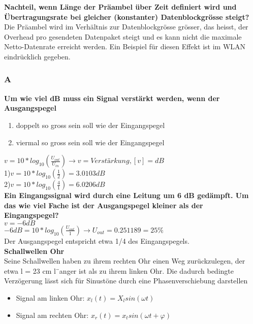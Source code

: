 \textbf{Nachteil, wenn Länge der Präambel über Zeit definiert wird und Übertragungsrate bei gleicher (konstanter) Datenblockgrösse steigt?}\\
Die Präambel wird im Verhältnis zur Datenblockgrösse grösser, das heisst, der Overhead pro gesendeten Datenpaket steigt und es kann nicht die maximale Netto-Datenrate erreicht werden. Ein Beispiel für diesen Effekt ist im WLAN eindrücklich gegeben.\\

\subsubsection{A}
\textbf{Um wie viel dB muss ein Signal verstärkt werden, wenn der Ausgangspegel}
\begin{enumerate}
    \item doppelt so gross sein soll wie der Eingangspegel
    \item viermal so gross sein soll wie der Eingangspegel
\end{enumerate}

$v=10*log_{10}(\frac{U_{out}}{U_{in}}) \rightarrow v=Verstärkung, [v]=dB$\\
1)$v=10*log_{10}(\frac{1}{2})=3.0103dB$\\
2)$v=10*log_{10}(\frac{4}{1})=6.0206dB$\\

\textbf{Ein Eingangssignal wird durch eine Leitung um 6 dB gedämpft. Um das wie viel Fache ist der Ausgangspegel kleiner als der Eingangspegel?}\\
$v=-6dB$\\
$-6dB=10*log_{10}(\frac{U_{out}}{1}) \rightarrow U_{out}=0.251189 = 25\%$\\
Der Ausgangspegel entspricht etwa 1/4 des Eingangspegels.\\

\textbf{Schallwellen Ohr}\\
Seine Schallwellen haben zu ihrem rechten Ohr einen Weg zurückzulegen, der etwa l = 23 cm l¨anger ist als zu ihrem linken Ohr. Die dadurch bedingte Verzögerung
lässt sich für Sinustöne durch eine Phasenverschiebung darstellen\\
\begin{itemize}
    \item Signal am linken Ohr: $x_l(t)=X_lsin(\omega t)$
    \item Signal am rechten Ohr: $x_r(t)=x_tsin(\omega t+\varphi )$\\
\end{itemize}

